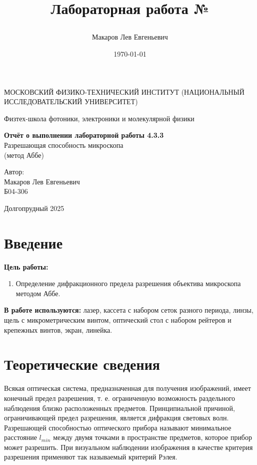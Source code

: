 \documentclass[a4paper,12pt]{article}
\author{Макаров Лев Евгеньевич}
\title{Лабораторная работа №\labnumber

\labname
}
\date{\today}
\newcommand\labname{Разрешающая способность микроскопа\\ (метод Аббе)}
\newcommand\labnumber{4.3.3}
\begin{document}
\begin{titlepage}
	\begin{center}
		{\large МОСКОВСКИЙ ФИЗИКО-ТЕХНИЧЕСКИЙ ИНСТИТУТ (НАЦИОНАЛЬНЫЙ ИССЛЕДОВАТЕЛЬСКИЙ УНИВЕРСИТЕТ)}
	\end{center}
	\begin{center}
		{\large Физтех-школа фотоники, электроники и молекулярной физики}
	\end{center}
	
	
	\vspace{4.5cm}
	{\huge
		\begin{center}
			{\bf Отчёт о выполнении лабораторной работы \labnumber}\\
			\labname
		\end{center}
	}
	\vspace{2cm}
	\begin{flushright}
		{\LARGE Автор:\\ Макаров Лев Евгеньевич \\
			\vspace{0.2cm}
			Б04-306}
	\end{flushright}
	\vspace{8cm}
	\begin{center}
		Долгопрудный 2025
	\end{center}
\end{titlepage}

\section{Введение}

\textbf{Цель работы:} 
\begin{enumerate}
	\item Определение дифракционного предела разрешения объектива микроскопа методом Аббе.
\end{enumerate}

\textbf{В работе используются:} лазер, кассета  с набором сеток разного периода, линзы, щель с микрометрическим винтом, оптический стол с набором рейтеров и крепежных винтов, экран, линейка.


\section{Теоретические сведения}

Всякая оптическая система, предназначенная для получения изображений, имеет конечный предел разрешения, т. е. ограниченную возможность раздельного наблюдения близко расположенных предметов. Принципиальной причиной, ограничивающей предел разрешения, является дифракция световых волн. Разрешающей способностью оптического прибора называют минимальное расстояние $l_{min}$ между двумя точками в пространстве предметов, которое прибор может разрешить. При визуальном наблюдении изображения в качестве критерия разрешения применяют так называемый критерий Рэлея.
\end{document}
